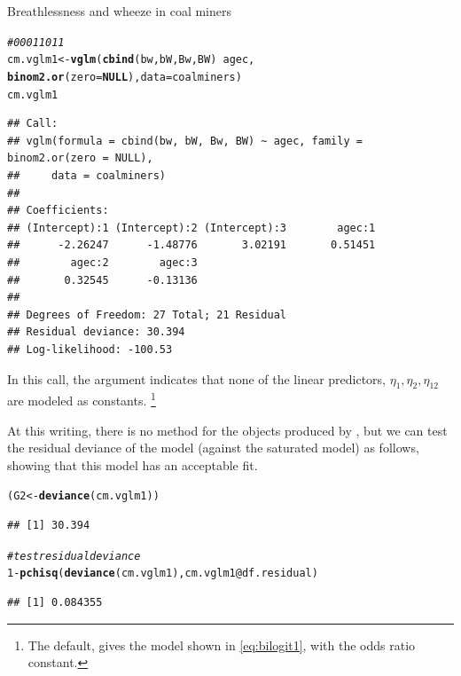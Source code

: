 \documentclass[11pt]{book}\usepackage[]{graphicx}\usepackage[]{color}
\makeatletter
\newcommand{\hlnum}[1]{\textcolor[rgb]{0.686,0.059,0.569}{#1}}%
\newcommand{\hlcom}[1]{\textcolor[rgb]{0.678,0.584,0.686}{\textit{#1}}}%
\newcommand{\hlopt}[1]{\textcolor[rgb]{0,0,0}{#1}}%
\newcommand{\hlstd}[1]{\textcolor[rgb]{0.345,0.345,0.345}{#1}}%
\newcommand{\hlkwa}[1]{\textcolor[rgb]{0.161,0.373,0.58}{\textbf{#1}}}%
\newcommand{\hlkwb}[1]{\textcolor[rgb]{0.69,0.353,0.396}{#1}}%
\newcommand{\hlkwc}[1]{\textcolor[rgb]{0.333,0.667,0.333}{#1}}%
\newcommand{\hlkwd}[1]{\textcolor[rgb]{0.737,0.353,0.396}{\textbf{#1}}}%
\newenvironment{kframe}{%
 \def\at@end@of@kframe{}%
 \ifinner\ifhmode%
  \def\at@end@of@kframe{\end{minipage}}%
  \begin{minipage}{\columnwidth}%
 \fi\fi%
 \def\FrameCommand##1{\hskip\@totalleftmargin \hskip-\fboxsep
 \colorbox{shadecolor}{##1}\hskip-\fboxsep
     \hskip-\linewidth \hskip-\@totalleftmargin \hskip\columnwidth}%
 \MakeFramed {\advance\hsize-\width
   \@totalleftmargin\z@ \linewidth\hsize
   \@setminipage}}%
 {\par\unskip\endMakeFramed%
 \at@end@of@kframe}
\newenvironment{knitrout}{}{} %
\renewenvironment{knitrout}{\small\renewcommand{\baselinestretch}{.85}}{} %
\makeatother
\begin{document}
\begin{Example}[coalminers]{Breathlessness and wheeze in coal miners}
\begin{knitrout}
\begin{kframe}
\begin{alltt}
\hlcom{#                      00  01  10  11}
\hlstd{cm.vglm1} \hlkwb{<-} \hlkwd{vglm}\hlstd{(}\hlkwd{cbind}\hlstd{(bw, bW, Bw, BW)} \hlopt{~} \hlstd{agec,}
                 \hlkwd{binom2.or}\hlstd{(}\hlkwc{zero}\hlstd{=}\hlkwa{NULL}\hlstd{),} \hlkwc{data}\hlstd{=coalminers)}
\hlstd{cm.vglm1}
\end{alltt}
\begin{verbatim}
## Call:
## vglm(formula = cbind(bw, bW, Bw, BW) ~ agec, family = binom2.or(zero = NULL), 
##     data = coalminers)
## 
## Coefficients:
## (Intercept):1 (Intercept):2 (Intercept):3        agec:1 
##      -2.26247      -1.48776       3.02191       0.51451 
##        agec:2        agec:3 
##       0.32545      -0.13136 
## 
## Degrees of Freedom: 27 Total; 21 Residual
## Residual deviance: 30.394 
## Log-likelihood: -100.53
\end{verbatim}
\end{kframe}
\end{knitrout}
\noindent In this call, the argument  indicates that none of the
linear predictors, $\eta_1, \eta_2, \eta_{12}$ are modeled as constants.%
\footnote{
The default,  gives the model shown in \eqref{eq:bilogit1},
with the odds ratio constant.
}

At this writing, there is no  method for the  objects
produced by , but we can test the residual deviance of the model
(against the saturated model) as follows, showing that this model has
an acceptable fit.
\begin{knitrout}
\color{fgcolor}\begin{kframe}
\begin{alltt}
\hlstd{(G2} \hlkwb{<-} \hlkwd{deviance}\hlstd{(cm.vglm1))}
\end{alltt}
\begin{verbatim}
## [1] 30.394
\end{verbatim}
\begin{alltt}
\hlcom{# test residual deviance}
\hlnum{1}\hlopt{-}\hlkwd{pchisq}\hlstd{(}\hlkwd{deviance}\hlstd{(cm.vglm1), cm.vglm1}\hlopt{@}\hlkwc{df.residual}\hlstd{)}
\end{alltt}
\begin{verbatim}
## [1] 0.084355
\end{verbatim}
\end{kframe}
\end{knitrout}



\end{Example}
\end{document}
